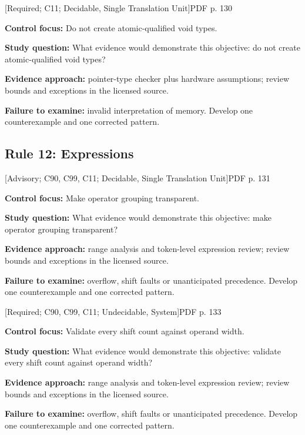 \documentclass[10pt,letterpaper]{article}
\begin{document}
\smallskip
{}
 \textsf{\footnotesize [Required; C11; Decidable, Single Translation Unit]}\hfill{\footnotesize PDF p. 130}\par
\textbf{Control focus:} Do not create atomic-qualified void types.\par
\textbf{Study question:} What evidence would demonstrate this objective: do not create atomic-qualified void types?\par
\textbf{Evidence approach:} pointer-type checker plus hardware assumptions; review bounds and exceptions in the licensed source.\par
\textbf{Failure to examine:} invalid interpretation of memory. Develop one counterexample and one corrected pattern.\par
\smallskip
\subsection{Rule 12: Expressions}
 \textsf{\footnotesize [Advisory; C90, C99, C11; Decidable, Single Translation Unit]}\hfill{\footnotesize PDF p. 131}\par
\textbf{Control focus:} Make operator grouping transparent.\par
\textbf{Study question:} What evidence would demonstrate this objective: make operator grouping transparent?\par
\textbf{Evidence approach:} range analysis and token-level expression review; review bounds and exceptions in the licensed source.\par
\textbf{Failure to examine:} overflow, shift faults or unanticipated precedence. Develop one counterexample and one corrected pattern.\par
\smallskip
{}
 \textsf{\footnotesize [Required; C90, C99, C11; Undecidable, System]}\hfill{\footnotesize PDF p. 133}\par
\textbf{Control focus:} Validate every shift count against operand width.\par
\textbf{Study question:} What evidence would demonstrate this objective: validate every shift count against operand width?\par
\textbf{Evidence approach:} range analysis and token-level expression review; review bounds and exceptions in the licensed source.\par
\textbf{Failure to examine:} overflow, shift faults or unanticipated precedence. Develop one counterexample and one corrected pattern.\par
\end{document}

